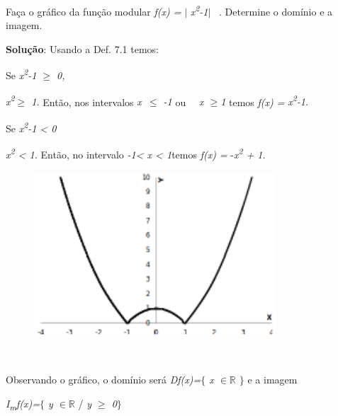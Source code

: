 \begin{texemplo}

Faça o gráfico da função modular \textit{f(x) =} $ \vert $ \textit{x\textsuperscript{2}-1$ \vert $ }~. Determine o domínio e a imagem.  

\textbf{Solução}: Usando a Def. 7.1 temos:

\quad Se \textit{x\textsuperscript{2}-1 $ \geq $  0, }

\quad \textit{x\textsuperscript{2}$ \geq $ 1.  }Então, nos intervalos \textit{ x~$ \leq $ -1   }ou~ \textit{~x $ \geq $1} temos \textit{ f(x) =} \textit{x\textsuperscript{2}-1. }

\quad Se \textit{x\textsuperscript{2}-1 < 0}

\quad \textit{x\textsuperscript{2} < 1.  }Então, no intervalo \textit{-1< x < 1}temos\textit{ f(x) =} -\textit{x\textsuperscript{2 } + 1.}

\begin{figure}[H]
	\begin{Center}
		\includegraphics[width=3.55in,height=2.42in]{capitulos/outras_funcoes/media/image33.pdf}
	\end{Center}
\end{figure}

~~

\quad Observando o gráfico, o domínio será   \textit{Df(x)=$ \{ $ x $ \in \mathbb{R} $ \textbf{ }$ \} $ } e a imagem

\quad \textit{I\textsubscript{m}f(x)=$ \{ $ y $ \in \mathbb{R} $  }/ \textit{y $ \geq $  0$ \} $ } \qedsymbol{}
\end{texemplo}

